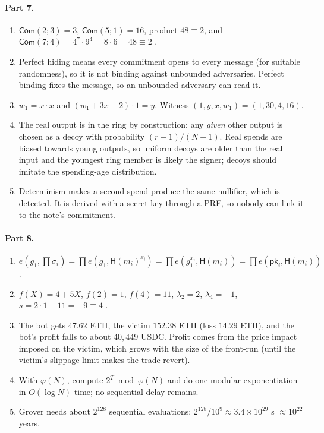 \documentclass[11pt,a4paper]{article}
\theoremstyle{definition}
\theoremstyle{plain}
\theoremstyle{remark}
\newcommand{\Hash}{\mathsf{H}}
\newcommand{\pk}{\mathsf{pk}}
\begin{document}
\paragraph{Part 7.}
\begin{enumerate}[nosep,leftmargin=1.5em]
\item $\mathsf{Com}(2;3)=3$, $\mathsf{Com}(5;1)=16$, product $48\equiv2$, and $\mathsf{Com}(7;4)=4^7\cdot9^4=8\cdot6=48\equiv2$ \checkmark.
\item Perfect hiding means every commitment opens to every message (for suitable randomness), so it is not binding against unbounded adversaries. Perfect binding fixes the message, so an unbounded adversary can read it.
\item $w_1=x\cdot x$ and $(w_1+3x+2)\cdot1=y$. Witness $(1,y,x,w_1)=(1,30,4,16)$.
\item The real output is in the ring by construction; any \emph{given} other output is chosen as a decoy with probability $(r-1)/(N-1)$. Real spends are biased towards young outputs, so uniform decoys are older than the real input and the youngest ring member is likely the signer; decoys should imitate the spending-age distribution.
\item Determinism makes a second spend produce the same nullifier, which is detected. It is derived with a secret key through a PRF, so nobody can link it to the note's commitment.
\end{enumerate}

\paragraph{Part 8.}
\begin{enumerate}[nosep,leftmargin=1.5em]
\item $e(g_1,\prod\sigma_i)=\prod e(g_1,\Hash(m_i)^{x_i})=\prod e(g_1^{x_i},\Hash(m_i))=\prod e(\pk_i,\Hash(m_i))$.
\item $f(X)=4+5X$, $f(2)=1$, $f(4)=11$, $\lambda_2=2$, $\lambda_4=-1$, $s=2\cdot1-11=-9\equiv4$ \checkmark.
\item The bot gets $47.62$ ETH, the victim $152.38$ ETH (loss $14.29$ ETH), and the bot's profit falls to about $40{,}449$ USDC. Profit comes from the price impact imposed on the victim, which grows with the size of the front-run (until the victim's slippage limit makes the trade revert).
\item With $\varphi(N)$, compute $2^T\bmod\varphi(N)$ and do one modular exponentiation in $O(\log N)$ time; no sequential delay remains.
\item Grover needs about $2^{128}$ sequential evaluations: $2^{128}/10^9\approx3.4\times10^{29}$ s $\approx10^{22}$ years.
\end{enumerate}
\normalsize
\end{document}
